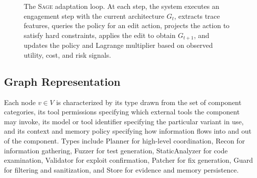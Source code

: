 \documentclass[sigconf,anonymous]{acmart}
\newcommand{\SAGE}{\textsc{Sage}\xspace}
\begin{document}
\begin{figure}[t]
\centering
{}
\caption{The \SAGE adaptation loop. At each step, the system executes an engagement step with the current architecture $G_t$, extracts trace features, queries the policy for an edit action, projects the action to satisfy hard constraints, applies the edit to obtain $G_{t+1}$, and updates the policy and Lagrange multiplier based on observed utility, cost, and risk signals.}
\label{fig:adaptation-loop}
\end{figure}

\subsection{Graph Representation}

Each node $v \in V$ is characterized by its type drawn from the set of component categories, its tool permissions specifying which external tools the component may invoke, its model or tool identifier specifying the particular variant in use, and its context and memory policy specifying how information flows into and out of the component. Types include Planner for high-level coordination, Recon for information gathering, Fuzzer for test generation, StaticAnalyzer for code examination, Validator for exploit confirmation, Patcher for fix generation, Guard for filtering and sanitization, and Store for evidence and memory persistence.
\end{document}
